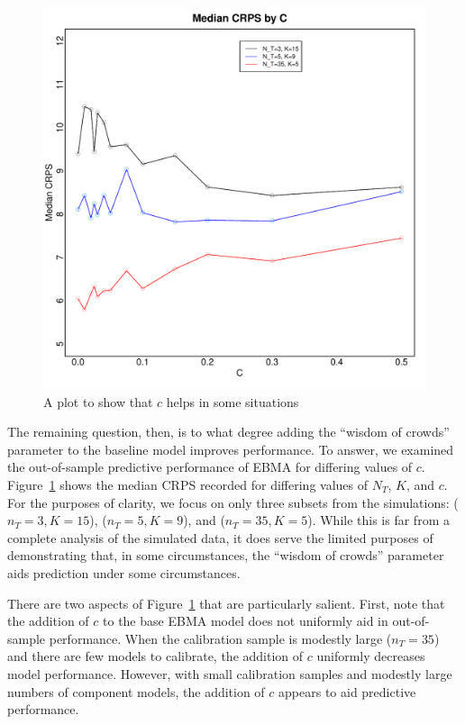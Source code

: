 \documentclass[12pt,fullpage,endnotes]{article}
\begin{document}
\begin{figure}[ht]
\caption{A plot to show that $c$ helps in some situations}
\label{simplot2}
\centering
\includegraphics[scale=.8]{SimTemp2}
\end{figure}

The remaining question, then, is to what degree adding the ``wisdom of
crowds'' parameter to the baseline model improves performance.  To
answer, we examined the out-of-sample predictive performance of EBMA
for differing values of $c$. Figure~\ref{simplot2} shows the median
CRPS recorded for differing values of $N_T$, $K$, and $c$.  For the
purposes of clarity, we focus on only three subsets from the
simulations: ($n_T=3, K=15$), ($n_T=5, K=9$), and ($n_T=35, K=5$).
While this is far from a complete analysis of the simulated data, it
does serve the limited purposes of demonstrating that, in some
circumstances, the ``wisdom of crowds'' parameter aids prediction
under some circumstances.

There are two aspects of Figure~\ref{simplot2} that are particularly
salient.  First, note that the addition of $c$ to the base EBMA model
does not uniformly aid in out-of-sample performance.  When the
calibration sample is modestly large ($n_T=35$) and there are few
models to calibrate, the addition of $c$ uniformly decreases model
performance.  However, with small calibration samples and modestly
large numbers of component models, the addition of $c$ appears to aid
predictive performance. 
\end{document}
